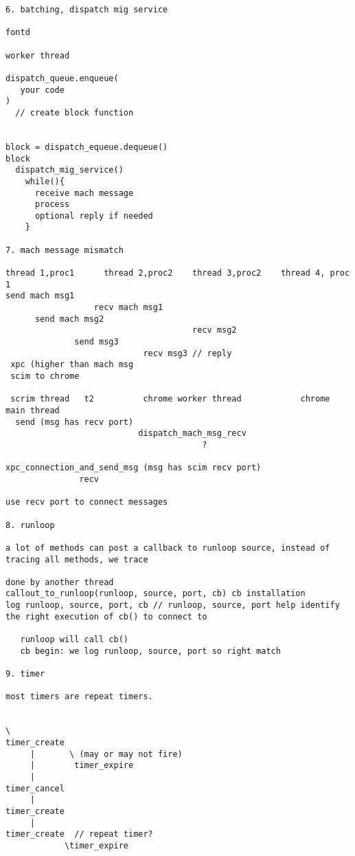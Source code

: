 \begin{verbatim}
6. batching, dispatch mig service

fontd

worker thread

dispatch_queue.enqueue(
   your code
)
  // create block function


block = dispatch_equeue.dequeue()
block
  dispatch_mig_service()
    while(){
      receive mach message
      process
      optional reply if needed
    }

7. mach message mismatch

thread 1,proc1      thread 2,proc2    thread 3,proc2    thread 4, proc 1
send mach msg1
                  recv mach msg1
      send mach msg2
                                      recv msg2
              send msg3
                            recv msg3 // reply
 xpc (higher than mach msg
 scim to chrome

 scrim thread   t2          chrome worker thread            chrome main thread
  send (msg has recv port)
                           dispatch_mach_msg_recv
                                        ?

xpc_connection_and_send_msg (msg has scim recv port)
               recv

use recv port to connect messages

8. runloop

a lot of methods can post a callback to runloop source, instead of
tracing all methods, we trace

done by another thread
callout_to_runloop(runloop, source, port, cb) cb installation
log runloop, source, port, cb // runloop, source, port help identify
the right execution of cb() to connect to

   runloop will call cb()
   cb begin: we log runloop, source, port so right match

9. timer

most timers are repeat timers.


\
timer_create
     |       \ (may or may not fire)
     |        timer_expire
     |
timer_cancel
     |
timer_create
     |
timer_create  // repeat timer?
            \timer_expire

\end{verbatim}
